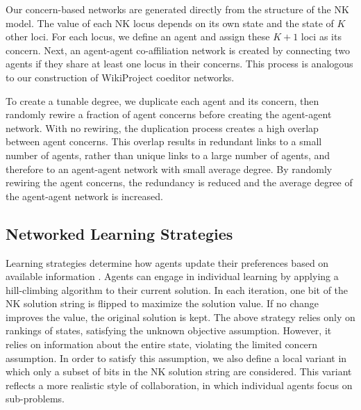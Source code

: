 Our concern-based networks are generated directly from the structure of the NK model.
The value of each NK locus depends on its own state and the state of $K$ other loci.
For each locus, we define an agent and assign these $K+1$ loci as its concern.
Next, an agent-agent co-affiliation network is created by connecting two agents if they share at least
one locus in their concerns.
This process is analogous to our construction of WikiProject coeditor networks.

To create a tunable degree, we duplicate each agent and its concern,
then randomly rewire a fraction of agent concerns before creating the agent-agent network.
With no rewiring, the duplication process creates a high overlap between agent concerns.
This overlap results in redundant links to a small number of agents,
rather than unique links to a large number of agents,
and therefore to an agent-agent network with small average degree.
By randomly rewiring the agent concerns, the redundancy is reduced
and the average degree of the agent-agent network is increased.

\subsection{Networked Learning Strategies}

Learning strategies determine how agents update their preferences based on
available information \cite{barkoczi_social_2016}.
Agents can engage in individual learning
by applying a hill-climbing algorithm to their current solution.
In each iteration, one bit of the NK solution string is flipped to maximize the solution value.
If no change improves the value, the original solution is kept.
The above strategy relies only on rankings of states,
satisfying the unknown objective assumption.
However, it relies on information about the entire state,
violating the limited concern assumption.
In order to satisfy this assumption,
we also define a local variant
in which only a subset of bits in the NK solution string are considered.
This variant reflects a more realistic style of collaboration,
in which individual agents focus on sub-problems.

